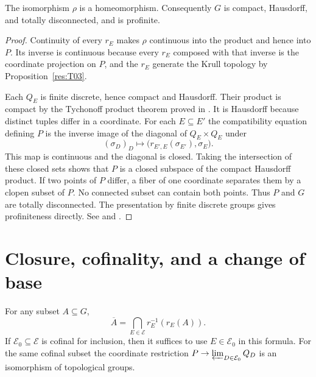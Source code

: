 \begin{theorem}\label{res:T06}
The isomorphism \(\rho\) is a homeomorphism. Consequently \(G\) is
compact, Hausdorff, and totally disconnected, and is profinite.
\end{theorem}

\begin{proof}
Continuity of every \(r_E\) makes \(\rho\) continuous into the product
and hence into \(P\). Its inverse is continuous because every
\(r_E\) composed with that inverse is the coordinate projection
on \(P\), and the \(r_E\) generate the Krull topology by
Proposition~\ref{res:T03}.

Each \(Q_E\) is finite discrete, hence compact and Hausdorff.
Their product is compact by the Tychonoff product theorem proved in
\cite[Chapter~5, \texttt{d10:05:tychonoff}]{d10}. It is Hausdorff
because distinct tuples differ in a coordinate.
For each \(E\subseteq E'\) the compatibility equation defining \(P\)
is the inverse image of the diagonal of \(Q_E\times Q_E\) under
\[
  (\sigma_D)_D \longmapsto
      \bigl(r_{E',E}(\sigma_{E'}),\sigma_E\bigr).
\]
This map is continuous and the diagonal is closed. Taking the
intersection of these closed sets shows that \(P\) is a closed
subspace of the compact Hausdorff product. If two points of \(P\)
differ, a fiber of one coordinate separates them by a clopen
subset of \(P\). No connected subset can contain both points.
Thus \(P\) and \(G\) are totally disconnected. The presentation
by finite discrete groups gives profiniteness directly.
See \cite[Propositions 7.8 and 7.25 and Example 7.26]{milne}
and \cite[Theorem 2.11.1]{rz}.
\end{proof}

\section{Closure, cofinality, and a change of base}

\begin{proposition}\label{res:T07}
For any subset \(A\subseteq G\),
\[
 \overline A=\bigcap_{E\in\mathcal E}r_E^{-1}(r_E(A)).
\]
If \(\mathcal E_0\subseteq\mathcal E\) is cofinal for inclusion,
then it suffices to use \(E\in\mathcal E_0\) in this formula.
For the same cofinal subset the coordinate restriction
\(P\to\varprojlim_{D\in\mathcal E_0}Q_D\) is an isomorphism of
topological groups.
\end{proposition}

